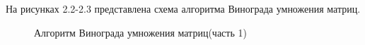 \documentclass[12pt,a4paper]{report}
\begin{document}
На рисунках 2.2-2.3 представлена схема алгоритма Винограда умножения матриц.

\begin{figure}[ht!]
	\caption{Алгоритм Винограда умножения матриц(часть 1)}
\end{figure}
\end{document}
